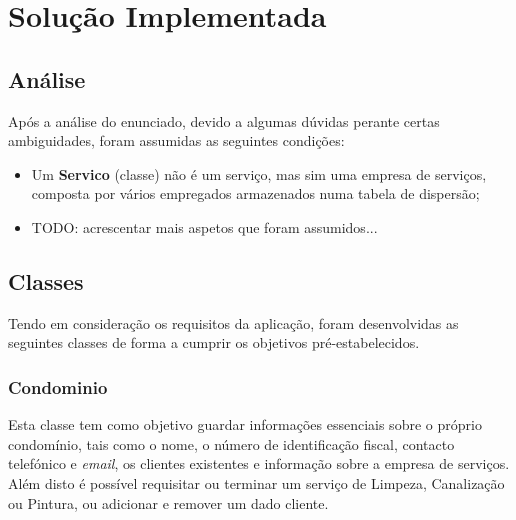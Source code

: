\documentclass[a4paper]{article}
\begin{document}




\newpage

\section{Solução Implementada}

\subsection{Análise}

Após a análise do enunciado, devido a algumas dúvidas perante certas ambiguidades, foram assumidas as seguintes condições:

\begin{itemize}

	\item Um \textbf{Servico} (classe) não é um serviço, mas sim uma empresa de serviços, composta por vários empregados armazenados numa tabela de dispersão;
	\item TODO: acrescentar mais aspetos que foram assumidos...

\end{itemize}

\subsection{Classes}

Tendo em consideração os requisitos da aplicação, foram desenvolvidas as seguintes classes de forma a cumprir os objetivos pré-estabelecidos.

\subsubsection{Condominio}

Esta classe tem como objetivo guardar informações essenciais sobre o próprio condomínio, tais como o nome, o número de identificação fiscal, contacto telefónico e \textit{email}, os clientes existentes e informação sobre a empresa de serviços. Além disto é possível requisitar ou terminar um serviço de Limpeza, Canalização ou Pintura, ou adicionar e remover um dado cliente.
\end{document}
